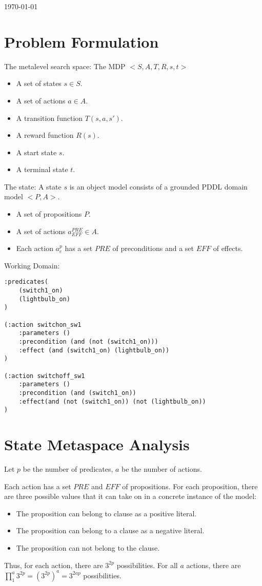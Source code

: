 \documentclass{article}
\begin{document}
\today

\section*{Problem Formulation}
The metalevel search space:
The MDP $<S, A, T, R, s, t>$
\begin{itemize}
\item A set of states $s \in S$. 
\item A set of actions $a \in A$.
\item A transition function $T(s,a,s')$.
\item A reward function $R(s)$.
\item A start state $s$.
\item A terminal state $t$.
\end{itemize}

The state: A state $s$ is an object model consists of a grounded PDDL domain model $<P, A>$. 
\begin{itemize} 
\item A set of propositions $P$.
\item A set of actions $a^{PRE}_{EFF} \in A$.
\item Each action $a^p_e$ has a set $PRE$ of preconditions and a set $EFF$ of effects. 
\end{itemize}


Working Domain:
\begin{lstlisting}[caption={LightSwitch Domain},
  label={lst:pddlmove},
  language=PDDL]
:predicates(
	(switch1_on)
	(lightbulb_on)
)

(:action switchon_sw1
	:parameters ()
	:precondition (and (not (switch1_on)))
	:effect (and (switch1_on) (lightbulb_on))
)

(:action switchoff_sw1
	:parameters ()
	:precondition (and (switch1_on))
	:effect(and (not (switch1_on)) (not (lightbulb_on))
)
\end{lstlisting}

\pagebreak
\section*{State Metaspace Analysis}
Let $p$ be the number of predicates, $a$ be the number of actions. 

Each action has a set $PRE$ and $EFF$ of propositions. For each proposition, there are three possible values that it can take on in a concrete instance of the model:
\begin{itemize}
\item The proposition can belong to clause as a positive literal.
\item The proposition can belong to a clause as a negative literal.
\item The proposition can not belong to the clause. 
\end{itemize}
Thus, for each action, there are $3^{2p}$ possibilities. For all $a$ actions, there are $\prod_1^a 3^{2p} = (3^{2p})^a = 3^{2ap}$ possibilities.
\end{document}
